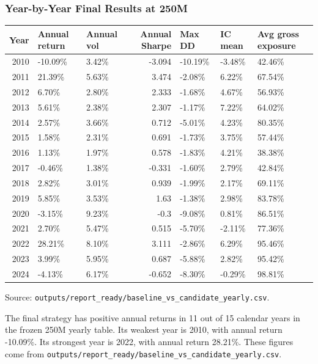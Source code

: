 \documentclass[
]{article}
\begin{document}
\hypertarget{year-by-year-final-results-at-250m}{%
\subsubsection{Year-by-Year Final Results at
250M}\label{year-by-year-final-results-at-250m}}

\begin{longtable}[]{@{}rllrlll@{}}
\toprule
Year & Annual return & Annual vol & Annual Sharpe & Max DD & IC mean &
Avg gross exposure \\
\midrule
\endhead
2010 & -10.09\% & 3.42\% & -3.094 & -10.19\% & -3.48\% & 42.46\% \\
2011 & 21.39\% & 5.63\% & 3.474 & -2.08\% & 6.22\% & 67.54\% \\
2012 & 6.70\% & 2.80\% & 2.333 & -1.68\% & 4.67\% & 56.93\% \\
2013 & 5.61\% & 2.38\% & 2.307 & -1.17\% & 7.22\% & 64.02\% \\
2014 & 2.57\% & 3.66\% & 0.712 & -5.01\% & 4.23\% & 80.35\% \\
2015 & 1.58\% & 2.31\% & 0.691 & -1.73\% & 3.75\% & 57.44\% \\
2016 & 1.13\% & 1.97\% & 0.578 & -1.83\% & 4.21\% & 38.38\% \\
2017 & -0.46\% & 1.38\% & -0.331 & -1.60\% & 2.79\% & 42.84\% \\
2018 & 2.82\% & 3.01\% & 0.939 & -1.99\% & 2.17\% & 69.11\% \\
2019 & 5.85\% & 3.53\% & 1.63 & -1.38\% & 2.98\% & 83.78\% \\
2020 & -3.15\% & 9.23\% & -0.3 & -9.08\% & 0.81\% & 86.51\% \\
2021 & 2.70\% & 5.47\% & 0.515 & -5.70\% & -2.11\% & 77.36\% \\
2022 & 28.21\% & 8.10\% & 3.111 & -2.86\% & 6.29\% & 95.46\% \\
2023 & 3.99\% & 5.95\% & 0.687 & -5.88\% & 2.82\% & 95.42\% \\
2024 & -4.13\% & 6.17\% & -0.652 & -8.30\% & -0.29\% & 98.81\% \\
\bottomrule
\end{longtable}

Source:
\texttt{outputs/report\_ready/baseline\_vs\_candidate\_yearly.csv}.

The final strategy has positive annual returns in 11 out of 15 calendar
years in the frozen 250M yearly table. Its weakest year is 2010, with
annual return -10.09\%. Its strongest year is 2022, with annual return
28.21\%. These figures come from
\texttt{outputs/report\_ready/baseline\_vs\_candidate\_yearly.csv}.
\end{document}

